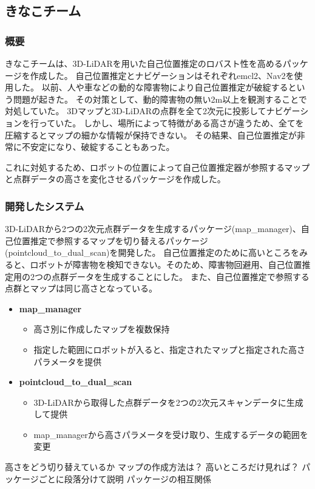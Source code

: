 \subsection{きなこチーム}


\subsubsection{概要}
きなこチームは、3D-LiDARを用いた自己位置推定のロバスト性を高めるパッケージを作成した。
自己位置推定とナビゲーションはそれぞれemcl2、Nav2を使用した。
以前、人や車などの動的な障害物により自己位置推定が破綻するという問題が起きた。
その対策として、動的障害物の無い2m以上を観測することで対処していた。
3Dマップと3D-LiDARの点群を全て2次元に投影してナビゲーションを行っていた。
しかし、場所によって特徴がある高さが違うため、全てを圧縮するとマップの細かな情報が保持できない。
その結果、自己位置推定が非常に不安定になり、破綻することもあった。

これに対処するため、ロボットの位置によって自己位置推定器が参照するマップと点群データの高さを変化させるパッケージを作成した。


\subsubsection{開発したシステム}
3D-LiDARから2つの2次元点群データを生成するパッケージ(map\_manager)、自己位置推定で参照するマップを切り替えるパッケージ(pointcloud\_to\_dual\_scan)を開発した。
自己位置推定のために高いところをみると、ロボットが障害物を検知できない。そのため、障害物回避用、自己位置推定用の2つの点群データを生成することにした。
また、自己位置推定で参照する点群とマップは同じ高さとなっている。
\begin{itemize}
  \item \textbf{map\_manager}
    \begin{itemize}
      \item 高さ別に作成したマップを複数保持
      \item 指定した範囲にロボットが入ると、指定されたマップと指定された高さパラメータを提供
    \end{itemize}
  \item \textbf{pointcloud\_to\_dual\_scan}
    \begin{itemize}
      \item 3D-LiDARから取得した点群データを2つの2次元スキャンデータに生成して提供
      \item map\_managerから高さパラメータを受け取り、生成するデータの範囲を変更
    \end{itemize}
\end{itemize}
高さをどう切り替えているか
マップの作成方法は？
高いところだけ見れば？
パッケージごとに段落分けて説明
パッケージの相互関係



